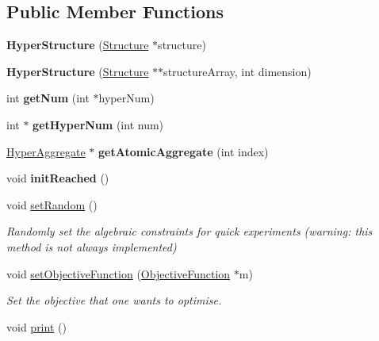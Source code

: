 \subsection*{Public Member Functions}
\begin{DoxyCompactItemize}
\item 
\hypertarget{classHyperStructure_a339a85f5da6decaccf7b517be1edbdca}{{\bfseries Hyper\-Structure} (\hyperlink{classStructure}{Structure} $\ast$structure)}\label{classHyperStructure_a339a85f5da6decaccf7b517be1edbdca}

\item 
\hypertarget{classHyperStructure_a6b5bc3c7e8c72b8dc69ea8bc191e2b45}{{\bfseries Hyper\-Structure} (\hyperlink{classStructure}{Structure} $\ast$$\ast$structure\-Array, int dimension)}\label{classHyperStructure_a6b5bc3c7e8c72b8dc69ea8bc191e2b45}

\item 
\hypertarget{classHyperStructure_ad054fc169f65693d2cd01a3b5fc0b1db}{int {\bfseries get\-Num} (int $\ast$hyper\-Num)}\label{classHyperStructure_ad054fc169f65693d2cd01a3b5fc0b1db}

\item 
\hypertarget{classHyperStructure_a9f10f159ec5828ef487265ae3473d95a}{int $\ast$ {\bfseries get\-Hyper\-Num} (int num)}\label{classHyperStructure_a9f10f159ec5828ef487265ae3473d95a}

\item 
\hypertarget{classHyperStructure_a947dcb1deb7679b8d68e91c28645a148}{\hyperlink{classHyperAggregate}{Hyper\-Aggregate} $\ast$ {\bfseries get\-Atomic\-Aggregate} (int index)}\label{classHyperStructure_a947dcb1deb7679b8d68e91c28645a148}

\item 
\hypertarget{classHyperStructure_a90f669ef93b94ed7bd4b0d04aa351c4c}{void {\bfseries init\-Reached} ()}\label{classHyperStructure_a90f669ef93b94ed7bd4b0d04aa351c4c}

\item 
\hypertarget{classHyperStructure_a39f186557c9e0e9207103d51ab03dd0d}{void \hyperlink{classHyperStructure_a39f186557c9e0e9207103d51ab03dd0d}{set\-Random} ()}\label{classHyperStructure_a39f186557c9e0e9207103d51ab03dd0d}

\begin{DoxyCompactList}\small\item\em Randomly set the algebraic constraints for quick experiments (warning\-: this method is not always implemented) \end{DoxyCompactList}\item 
void \hyperlink{classHyperStructure_a744a8c5b7bf67dec8084c5d2b8a4927d}{set\-Objective\-Function} (\hyperlink{classObjectiveFunction}{Objective\-Function} $\ast$m)
\begin{DoxyCompactList}\small\item\em Set the objective that one wants to optimise. \end{DoxyCompactList}\item 
\hypertarget{classHyperStructure_ae2c9f70f3b85cde571fdcf06b7ae08ea}{void \hyperlink{classHyperStructure_ae2c9f70f3b85cde571fdcf06b7ae08ea}{print} ()}\label{classHyperStructure_ae2c9f70f3b85cde571fdcf06b7ae08ea}


\end{DoxyCompactItemize}

